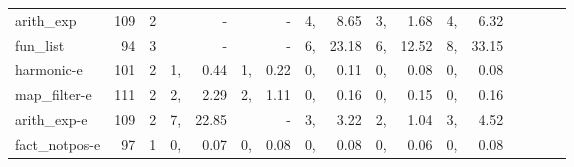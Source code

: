 \begin{table*}
\begin{center}
\begin{tabular}{|l|r|r|p{0pt}r|p{0pt}r|p{0pt}r|p{0pt}r|p{0pt}r|p{0pt}r|p{0pt}r|}
arith\_exp        &  109 & 2 &           & - &           & - &  4, &    8.65 &  3, &    1.68 &  4, &    6.32 \\
fun\_list         &   94 & 3 &           & - &           & - &  6, &   23.18 &  6, &   12.52 &  8, &   33.15 \\
harmonic-e        &  101 & 2 &  1, &    0.44 &  1, &    0.22 &  0, &    0.11 &  0, &    0.08 &  0, &    0.08 \\
map\_filter-e     &  111 & 2 &  2, &    2.29 &  2, &    1.11 &  0, &    0.16 &  0, &    0.15 &  0, &    0.16 \\
arith\_exp-e      &  109 & 2 &  7, &   22.85 &           & - &  3, &    3.22 &  2, &    1.04 &  3, &    4.52 \\
fact\_notpos-e    &   97 & 1 &  0, &    0.07 &  0, &    0.08 &  0, &    0.08 &  0, &    0.06 &  0, &    0.08 \\
\hline
\end{tabular}
\end{center}
\end{table*}

